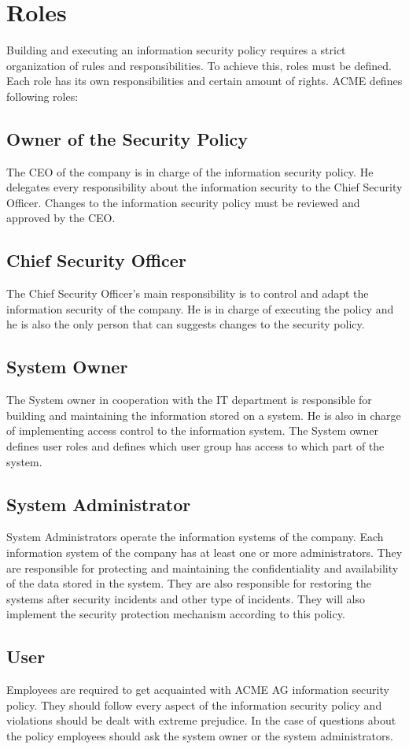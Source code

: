 \chapter{Roles}
Building and executing an information security policy requires a strict organization of rules and responsibilities. To achieve this, roles must be defined. Each role has its own responsibilities and certain amount of rights. ACME defines following roles\cite{Host}:
\section{Owner of the Security Policy}
The CEO of the company is in charge of the information security policy. He delegates every responsibility about the information security to the Chief Security Officer. Changes to the information security policy must be reviewed and approved by the CEO. 
\section{Chief Security Officer}
The Chief Security Officer's main responsibility is to control and adapt the information security of the company.  He is in charge of executing the policy and he is also the only person that can suggests changes to the security policy. 
\section{System Owner}
The System owner in cooperation with the IT department is responsible for building and maintaining the information stored on a system. He is also in charge of implementing access control to the information system. The System owner defines user roles and defines which user group has access to which part of the system.  
\section{System Administrator}
System Administrators operate the information systems of the company. Each information system of the company has at least one or more administrators. They are responsible for protecting and maintaining the confidentiality and availability of the data stored in the system. They are also responsible for restoring the systems after security incidents and other type of incidents. They will also implement the security protection mechanism according to this policy. 
\section{User}
Employees are required to get acquainted with ACME AG information security policy. They should follow every aspect of the information security policy and violations should be dealt with extreme prejudice. In the case of questions about the policy employees should ask the system owner or the system administrators.   
